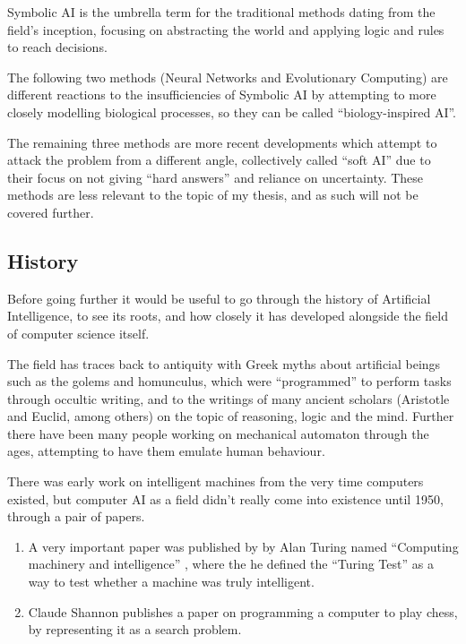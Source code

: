 Symbolic AI is the umbrella term for the traditional methods dating from the
field's inception, focusing on abstracting the world and applying logic and
rules to reach decisions.

The following two methods (Neural Networks and Evolutionary Computing) are
different reactions to the insufficiencies of Symbolic AI by attempting to more
closely modelling biological processes, so they can be called ``biology-inspired
AI''.

The remaining three methods are more recent developments which attempt to attack
the problem from a different angle, collectively called ``soft AI'' due to their
focus on not giving ``hard answers'' and reliance on uncertainty. These methods
are less relevant to the topic of my thesis, and as such will not be covered
further.

\subsection{History}
\label{sec:trad-ai-history}

Before going further it would be useful to go through the history of Artificial
Intelligence, to see its roots, and how closely it has developed alongside the
field of computer science itself. \citep{luger2005artificial,buchanan2002brief}

The field has traces back to antiquity with Greek myths about artificial beings
such as the golems and homunculus, which were ``programmed'' to perform tasks
through occultic writing, and to the writings of many ancient scholars
(Aristotle and Euclid, among others) on the topic of reasoning, logic and the
mind. Further there have been many people working on mechanical automaton
through the ages, attempting to have them emulate human behaviour.

There was early work on intelligent machines from the very time computers
existed, but computer AI as a field didn't really come into existence until
1950, through a pair of papers.

\begin{enumerate}
\item A very important paper was published by by Alan Turing named ``Computing
  machinery and intelligence'' \citep{turing1950computing}, where the he defined
  the ``Turing Test'' as a way to test whether a machine was truly intelligent.
\item Claude Shannon publishes a paper on programming a computer to play chess,
  by representing it as a search problem. \citep{shannon1950programming}
\end{enumerate}

